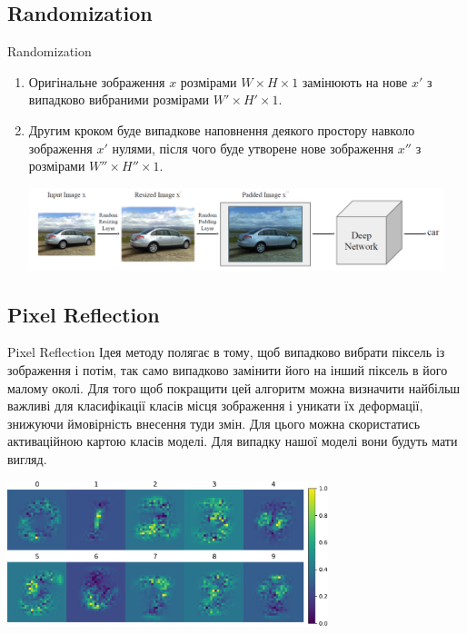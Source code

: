 \documentclass[aspectratio=169]{beamer}
\begin{document}
	\subsection{Randomization}
	\begin{frame}{Randomization}
		\begin{enumerate}
			\item Оригінальне зображення $x$ розмірами $W \times H \times 1$ замінюють на нове $x'$ з випадково вибраними розмірами $W' \times H' \times 1$.
			\item Другим кроком буде випадкове наповнення деякого простору навколо зображення $x'$ нулями, після чого буде утворене нове зображення $x''$ з розмірами $W'' \times H'' \times 1$.
			\begin{center}
				\includegraphics[width=0.95\textwidth]{./resources/randomization.png}
			\end{center}
		\end{enumerate}
	\end{frame}

	\subsection{Pixel Reflection}
	\begin{frame}{Pixel Reflection}
		Ідея методу полягає в тому, щоб випадково вибрати піксель із зображення і потім, так само випадково замінити його на інший піксель в його малому околі.	
		Для того щоб покращити цей алгоритм можна визначити найбільш важливі для класифікації класів місця зображення і уникати їх деформації, знижуючи ймовірність внесення туди змін. Для цього можна скористатись активаційною картою класів моделі. Для випадку нашої моделі вони будуть мати вигляд.
		\begin{center}
			\includegraphics[width=0.7\textwidth]{../CourseWorkLatex/resources/classactivationmap.pdf}
		\end{center}
	\end{frame}
\end{document}
